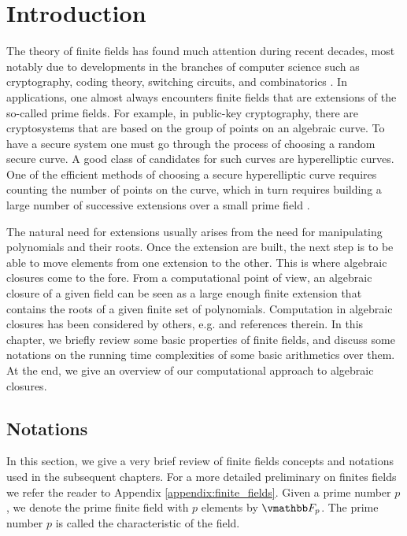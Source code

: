 \graphicspath{{introduction/}}

\chapter{Introduction}

The theory of finite fields has found much attention during recent decades, most notably due to 
developments in the branches of computer science such as cryptography, coding theory, switching 
circuits, and combinatorics \cite{lidl2012applied}. In applications, one almost always encounters 
finite fields that are extensions of the so-called prime fields. For example, in public-key 
cryptography, there are cryptosystems that are based on the group of points on an algebraic curve. 
To have a secure system one must go through the process of choosing a random secure curve. A good 
class of candidates for such curves are hyperelliptic curves. One of the efficient methods of 
choosing a secure hyperelliptic curve requires counting the number of points on the curve, which in 
turn requires building a large number of successive extensions over a small prime field 
\cite{df10, GaSc12}. 

The natural need for extensions usually arises from the need for manipulating polynomials and their 
roots. Once the extension are built, the next step is to be able to move elements from one 
extension to the other. This is where algebraic closures come to the fore. From a computational 
point of view, an algebraic closure of a given field can be seen as a large enough finite extension 
that contains the roots of a given finite set of polynomials. Computation in algebraic closures 
has been considered by others, e.g. \cite{Steel2010342} and references therein. In this chapter, we 
briefly review some basic properties of finite fields, and discuss some notations on the running 
time complexities of some basic arithmetics over them. At the end, we give an overview of our 
computational approach to algebraic closures.


\section{Notations}

In this section, we give a very brief review of finite fields concepts and notations used in the 
subsequent chapters. For a more detailed preliminary on finites fields we refer the reader to 
Appendix \ref{appendix:finite_fields}. Given a prime number $p$, we denote the prime finite field 
with $p$ elements by $\F_p$. The prime number $p$ is called the characteristic of the field. 

